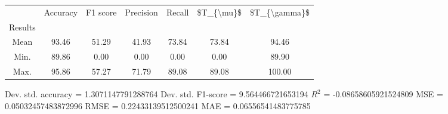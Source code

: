\begin{tabular}{|c|c|c|c|c|c|c|}
\toprule
{} &  Accuracy &  F1 score &  Precision &  Recall &  \$T\_\{\textbackslash mu\}\$ &  \$T\_\{\textbackslash gamma\}\$ \\
Results &           &           &            &         &            &               \\
\hline
Mean    &     93.46 &     51.29 &      41.93 &   73.84 &      73.84 &         94.46 \\
Min.    &     89.86 &      0.00 &       0.00 &    0.00 &       0.00 &         89.90 \\
Max.    &     95.86 &     57.27 &      71.79 &   89.08 &      89.08 &        100.00 \\
\bottomrule
\end{tabular}

 Dev. std. accuracy = 1.3071147791288764
 Dev. std. F1-score = 9.564466721653194
 $R^2$ = -0.08658605921524809
 MSE = 0.05032457483872996
 RMSE = 0.22433139512500241
 MAE = 0.06556541483775785